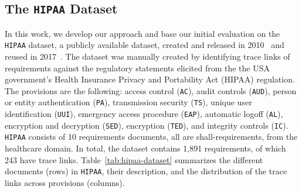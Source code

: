 \subsection{The \texttt{HIPAA} Dataset}\label{subsec:datacol}

In this work, we develop our approach and base our initial evaluation on the \texttt{HIPAA} dataset, a publicly available dataset, created and released in 2010~\cite{cleland:2010} and reused in 2017~\cite{Guo:17}. 
The dataset was manually created by identifying trace links of requirements against the regulatory statements elicited from the the USA government's Health Insurance Privacy and Portability Act (HIPAA) regulation. The provisions are the following:  access control (\texttt{AC}), audit controls (\texttt{AUD}), person or entity authentication (\texttt{PA}), transmission security (\texttt{TS}), unique user identification (\texttt{UUI}), emergency access procedure (\texttt{EAP}), automatic logoff (\texttt{AL}), encryption and decryption (\texttt{SED}), encryption (\texttt{TED}), and integrity controls (\texttt{IC}).
\texttt{HIPAA} consists of 10 requirements documents, all are shall-requirements, from the healthcare domain. In total, the dataset contains 1,891 requirements, of which 243 have trace links. Table~\ref{tab:hipaa-dataset} summarizes the different documents (rows) in \texttt{HIPAA}, their description, and the distribution of the trace links across provisions (columns). 




